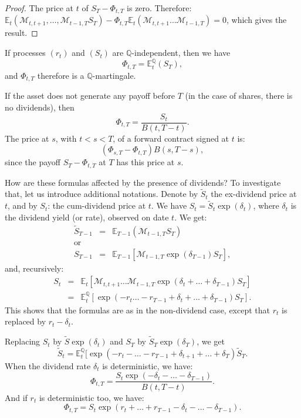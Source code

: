 \documentclass[
  12pt,
]{book}
\theoremstyle{definition}
\theoremstyle{definition}
\theoremstyle{definition}
\theoremstyle{definition}
\theoremstyle{remark}
\begin{document}
\begin{proof}
The price at \(t\) of \(S_T - \Phi_{t,T}\) is zero. Therefore:
\(\mathbb{E}_t (\mathcal{M}_{t,t+1}, \ldots, \mathcal{M}_{t-1,T} S_T) - \Phi_{t,T} \mathbb{E}_t (\mathcal{M}_{t,t+1} \ldots \mathcal{M}_{t-1,T}) = 0\), which gives the result.
\end{proof}

If processes \((r_t)\) and \((S_t)\) are \(\mathbb{Q}\)-independent, then we have
\[
\Phi_{t,T} = \mathbb{E}^{\mathbb{Q}}_t (S_T),
\]
and \(\Phi_{t,T}\) therefore is a \(\mathbb{Q}\)-martingale.

If the asset does not generate any payoff before \(T\) (in the case of shares, there is no dividends), then
\[
\Phi_{t,T} = \frac{S_t}{B(t,T-t)}.
\]
The price at \(s\), with \(t<s<T\), of a forward contract signed at \(t\) is:
\[
(\Phi_{s,T} - \Phi_{t,T}) B (s,T-s),
\]
since the payoff \(S_T - \Phi_{t,T}\) at \(T\) has this price at \(s\).

How are these formulas affected by the presence of dividends? To investigate that, let us introduce additional notations. Denote by \(\tilde{S}_t\) the ex-dividend price at \(t\), and by \(S_t\): the cum-dividend price at \(t\). We have \(S_t = \tilde{S}_t \exp (\delta_t)\), where \(\delta_t\) is the dividend yield (or rate), observed on date \(t\). We get:
\begin{eqnarray*}
\tilde{S}_{T-1} & = & \mathbb{E}_{T-1} (\mathcal{M}_{t-1,T} S_T) \\
\mbox{or } \\
S_{T-1} & = & \mathbb{E}_{T-1} [\mathcal{M}_{t-1,T} \exp (\delta_{T-1})
S_T],
\end{eqnarray*}
and, recursively:
\begin{eqnarray*}
S_t & = & \mathbb{E}_t [\mathcal{M}_{t,t+1} \ldots \mathcal{M}_{t-1,T} \exp (\delta_t + \ldots + \delta_{T-1}) S_T] \\
&=& \mathbb{E}^{\mathbb{Q}}_t [\exp (-r_t \ldots - r_{T-1} + \delta_t + \ldots + \delta_{T-1}) S_T].
\end{eqnarray*}
This shows that the formulas are as in the non-dividend case, except that \(r_t\) is replaced by \(r_t - \delta_t\).

Replacing \(S_t\) by \(\tilde{S} \exp(\delta_t)\) and \(S_T\) by \(\tilde{S}_T \exp (\delta_T)\), we get
\[
\tilde{S}_t = \mathbb{E}^{\mathbb{Q}}_t [\exp (-r_t -\ldots-r_{T-1} + \delta_{t+1} + \ldots + \delta_T) \tilde{S}_T.
\]
When the dividend rate \(\delta_t\) is deterministic, we have:
\[
\Phi_{t,T} = \frac{S_t \exp (-\delta_t - \ldots - \delta_{T-1})}{B(t,T-t)}.
\]
And if \(r_t\) is deterministic too, we have:
\[
\Phi_{t,T} = S_t \exp   (r_t + \ldots + r_{T-1} - \delta_t - \ldots - \delta_{T-1}).
\]
\end{document}
